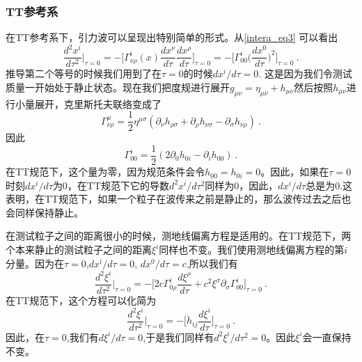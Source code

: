 \subsubsection{TT参考系}
在TT参考系下，引力波可以呈现出特别简单的形式。从\autoref{intera_eq3} 可以看出
\begin{equation}
\frac{d^2 x^i}{d\tau^2} \bigg|_{\tau = 0} = - \bigg[ \Gamma^i_{\nu\rho} (x) \frac{dx^\nu}{d\tau} \frac{dx^\rho}{d\tau} \bigg]_{\tau = 0} = - \bigg[ \Gamma^i_{00} \bigg( \frac{dx^0}{d\tau} \bigg)^2 \bigg]_{\tau = 0}~.
\end{equation}
推导第二个等号的时候我们用到了在$\tau = 0$的时候$dx^i/d\tau = 0$. 这是因为我们令测试质量一开始处于静止状态。现在我们把度规进行展开$g_{\mu\nu} = \eta_{\mu\nu} + h_{\mu\nu}$然后按照$h_{\mu\nu}$进行小量展开，克里斯托夫联络变成了
\begin{equation}
\Gamma^\mu_{\nu\rho} = \frac{1}{2} \eta^{\mu\sigma} (\partial_\nu h_{\rho\sigma} + \partial_\rho h_{\nu\sigma} - \partial_{\sigma} h_{\nu\rho}  )~. 
\end{equation}
因此
\begin{equation}
\Gamma^i_{00} = \frac{1}{2} (2\partial_0 h_{0i} - \partial_i h_{00}) ~.
\end{equation}
在TT规范下，这个量为零，因为规范条件会令$h_{00} = h_{0i} = 0$。因此，如果在$\tau = 0$时刻$dx^i/d\tau$为0，在TT规范下它的导数$d^2 x^i/d\tau^2$同样为0，因此，$dx^i/d\tau$总是为0.这表明，在TT规范下，如果一个粒子在波传来之前是静止的，那么波传过去之后也会同样保持静止。

在测试粒子之间的距离很小的时候，测地线偏离方程是适用的。在TT规范下，两个本来静止的测试粒子之间的距离$\xi^i$同样也不变。我们使用测地线偏离方程的第$i$分量。因为在$\tau = 0$,$dx^i/d\tau = 0$, $dx^0/d\tau = c$,所以我们有
\begin{equation}
\frac{d^2\xi^i}{d\tau^2} \bigg|_{\tau = 0} = - \bigg[ 2 c \Gamma^i_{0\rho} \frac{d\xi^\rho}{d\tau} + c^2 \xi^\sigma \partial_\sigma \Gamma^i_{00} \bigg]_{\tau = 0}~.
\end{equation}
在TT规范下，这个方程可以化简为
\begin{equation}
\frac{d^2\xi^i}{d\tau^2}\bigg|_{\tau = 0} = - \bigg[ \dot{h}_{ij} \frac{d\xi^i}{d\tau} \bigg]_{\tau = 0}~. 
\end{equation}
因此，在$\tau = 0$,我们有$d\xi^i/d\tau = 0$,于是我们同样有$d^2\xi^i/d\tau^2 = 0$。因此$\xi^i$会一直保持不变。



